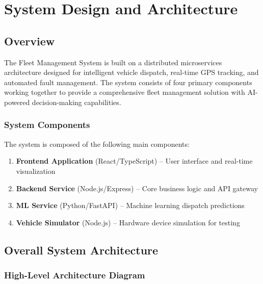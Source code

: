 
\chapter{System Design and Architecture}

\section{Overview}

The Fleet Management System is built on a distributed microservices architecture designed for intelligent vehicle dispatch, real-time GPS tracking, and automated fault management. The system consists of four primary components working together to provide a comprehensive fleet management solution with AI-powered decision-making capabilities.

\subsection{System Components}

The system is composed of the following main components:

\begin{enumerate}
    \item \textbf{Frontend Application} (React/TypeScript) -- User interface and real-time visualization
    \item \textbf{Backend Service} (Node.js/Express) -- Core business logic and API gateway
    \item \textbf{ML Service} (Python/FastAPI) -- Machine learning dispatch predictions
    \item \textbf{Vehicle Simulator} (Node.js) -- Hardware device simulation for testing
\end{enumerate}

\section{Overall System Architecture}

\subsection{High-Level Architecture Diagram}

